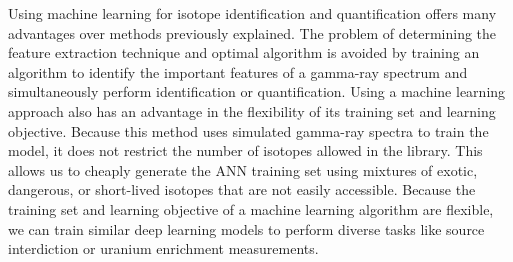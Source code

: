 

Using machine learning for isotope identification and quantification offers many advantages over methods previously explained. The problem of determining the feature extraction technique and optimal algorithm is avoided by training an algorithm to identify the important features of a gamma-ray spectrum and simultaneously perform identification or quantification. Using a machine learning approach also has an advantage in the flexibility of its training set and learning objective. Because this method uses simulated gamma-ray spectra to train the model, it does not restrict the number of isotopes allowed in the library. This allows us to cheaply generate the ANN training set using mixtures of exotic, dangerous, or short-lived isotopes that are not easily accessible. Because the training set and learning objective of a machine learning algorithm are flexible, we can train similar deep learning models to perform diverse tasks like source interdiction or uranium enrichment measurements.


